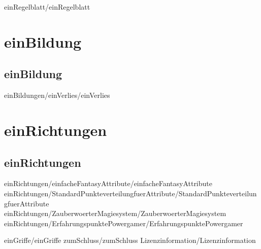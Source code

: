 
 {einRegelblatt/einRegelblatt}

\part {einBildung}
\chapter {einBildung}
 {einBildungen/einVerlies/einVerlies}

\part {einRichtungen}
\chapter {einRichtungen}
 {einRichtungen/einfacheFantasyAttribute/einfacheFantasyAttribute}
 {einRichtungen/StandardPunkteverteilungfuerAttribute/StandardPunkteverteilungfuerAttribute}
 {einRichtungen/ZauberwoerterMagiesystem/ZauberwoerterMagiesystem}
 {einRichtungen/ErfahrungspunktePowergamer/ErfahrungspunktePowergamer}

 {einGriffe/einGriffe}
 {zumSchluss/zumSchluss}
 {Lizenzinformation/Lizenzinformation}

